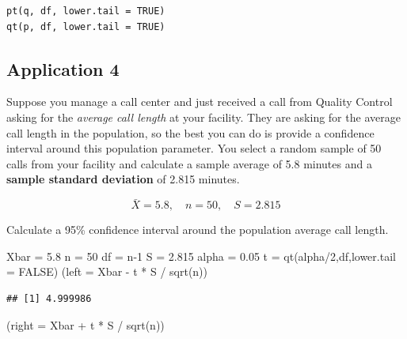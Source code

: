 \documentclass[
]{book}
\newenvironment{Shaded}{\begin{snugshade}}{\end{snugshade}}
\newcommand{\AttributeTok}[1]{\textcolor[rgb]{0.77,0.63,0.00}{#1}}
\newcommand{\ConstantTok}[1]{\textcolor[rgb]{0.00,0.00,0.00}{#1}}
\newcommand{\DecValTok}[1]{\textcolor[rgb]{0.00,0.00,0.81}{#1}}
\newcommand{\FloatTok}[1]{\textcolor[rgb]{0.00,0.00,0.81}{#1}}
\newcommand{\FunctionTok}[1]{\textcolor[rgb]{0.00,0.00,0.00}{#1}}
\newcommand{\NormalTok}[1]{#1}
\newcommand{\OtherTok}[1]{\textcolor[rgb]{0.56,0.35,0.01}{#1}}
\newcommand{\SpecialCharTok}[1]{\textcolor[rgb]{0.00,0.00,0.00}{#1}}
\begin{document}
\begin{verbatim}
pt(q, df, lower.tail = TRUE)
qt(p, df, lower.tail = TRUE)
\end{verbatim}

\hypertarget{application-4}{%
\subsection{Application 4}\label{application-4}}

Suppose you manage a call center and just received a call from Quality Control asking for the \emph{average call length} at your facility. They are asking for the average call length in the population, so the best you can do is provide a confidence interval around this population parameter. You select a random sample of 50 calls from your facility and calculate a sample average of 5.8 minutes and a \textbf{sample standard deviation} of 2.815 minutes.

\[\bar{X}=5.8, \quad n=50, \quad S=2.815\]

Calculate a 95\% confidence interval around the population average call length.

\begin{Shaded}
\begin{Highlighting}[]
\NormalTok{Xbar }\OtherTok{=} \FloatTok{5.8}
\NormalTok{n }\OtherTok{=} \DecValTok{50}
\NormalTok{df }\OtherTok{=}\NormalTok{ n}\DecValTok{{-}1}
\NormalTok{S }\OtherTok{=} \FloatTok{2.815}
\NormalTok{alpha }\OtherTok{=} \FloatTok{0.05}
\NormalTok{t }\OtherTok{=} \FunctionTok{qt}\NormalTok{(alpha}\SpecialCharTok{/}\DecValTok{2}\NormalTok{,df,}\AttributeTok{lower.tail =} \ConstantTok{FALSE}\NormalTok{)}
\NormalTok{(}\AttributeTok{left =}\NormalTok{ Xbar }\SpecialCharTok{{-}}\NormalTok{ t }\SpecialCharTok{*}\NormalTok{ S }\SpecialCharTok{/} \FunctionTok{sqrt}\NormalTok{(n))}
\end{Highlighting}
\end{Shaded}

\begin{verbatim}
## [1] 4.999986
\end{verbatim}

\begin{Shaded}
\begin{Highlighting}[]
\NormalTok{(}\AttributeTok{right =}\NormalTok{ Xbar }\SpecialCharTok{+}\NormalTok{ t }\SpecialCharTok{*}\NormalTok{ S }\SpecialCharTok{/} \FunctionTok{sqrt}\NormalTok{(n))}
\end{Highlighting}
\end{Shaded}
\end{document}
